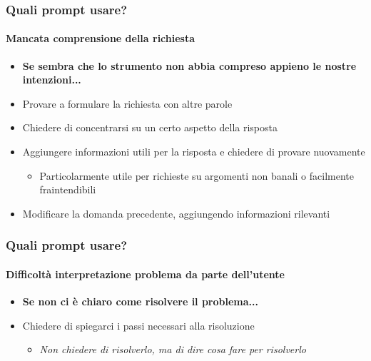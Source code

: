 \begin{contentframe}
    \frametitle{Quali prompt usare?}
    \framesubtitle{Mancata comprensione della richiesta}
    
    \begin{itemize}
        \item \textbf{Se sembra che lo strumento non abbia compreso appieno le nostre intenzioni...}

        \bigskip
        \item Provare a formulare la richiesta con altre parole
        \item Chiedere di concentrarsi su un certo aspetto della risposta
        \item Aggiungere informazioni utili per la risposta e chiedere di provare nuovamente
        \begin{itemize}
            \item Particolarmente utile per richieste su argomenti non banali o facilmente fraintendibili
        \end{itemize}
        \item Modificare la domanda precedente, aggiungendo informazioni rilevanti
    \end{itemize}
\end{contentframe}

\begin{contentframe}
    \frametitle{Quali prompt usare?}
    \framesubtitle{Difficoltà interpretazione problema da parte dell'utente}
    
    \begin{itemize}
        \item \textbf{Se non ci è chiaro come risolvere il problema...}

        \bigskip
        \item Chiedere di spiegarci i passi necessari alla risoluzione
        \begin{itemize}
            \item \textit{Non chiedere di risolverlo, ma di dire cosa fare per risolverlo}
        \end{itemize}
    \end{itemize}
\end{contentframe}

